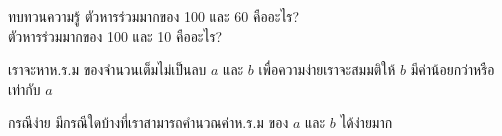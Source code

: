 \begin{quiz}{ทบทวน{\wbr}ความ{\wbr}รู้}
ตัวหารร่วมมาก{\wbr}ของ 100 และ 60 คือ{\wbr}อะไร? \\
ตัวหารร่วมมาก{\wbr}ของ 100 และ 10 คือ{\wbr}อะไร?
\end{quiz}

เรา{\wbr}จะ{\wbr}หา{\wbr}ห.{\wbr}ร.{\wbr}ม ของ{\wbr}จำนวนเต็ม{\wbr}ไม่{\wbr}เป็น{\wbr}ลบ $a$ และ $b$ เพื่อ{\wbr}ความ{\wbr}ง่าย{\wbr}เรา{\wbr}จะ{\wbr}สมมติ{\wbr}ให้ $b$
มี{\wbr}ค่า{\wbr}น้อย{\wbr}กว่า{\wbr}หรือ{\wbr}เท่า{\wbr}กับ $a$

\begin{quiz}{กรณี{\wbr}ง่าย}
มี{\wbr}กรณี{\wbr}ใด{\wbr}บ้าง{\wbr}ที่{\wbr}เรา{\wbr}สามารถ{\wbr}คำนวณ{\wbr}ค่า{\wbr}ห.{\wbr}ร.{\wbr}ม ของ $a$ และ $b$ ได้{\wbr}ง่าย{\wbr}มาก{\wbr}
\end{quiz}





